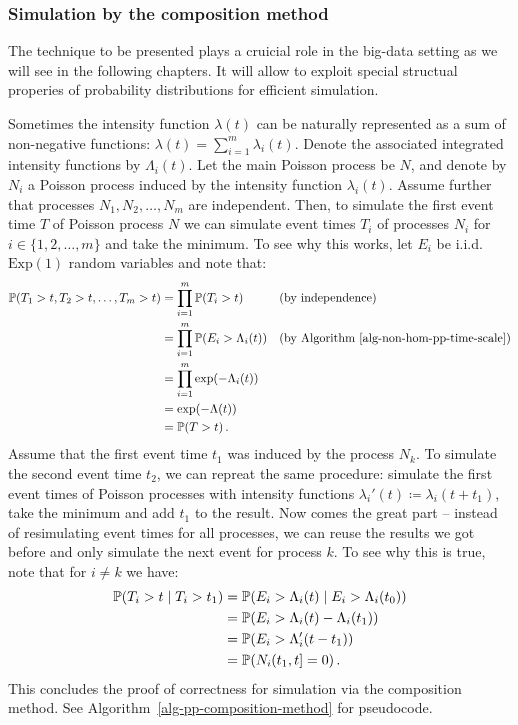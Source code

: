 \documentclass[report.tex]{subfiles}
\begin{document}
\subsubsection{Simulation by the composition method}

The technique to be presented plays a cruicial role in the big-data
setting as we will see in the following chapters.
It will allow to exploit special structual properies of probability distributions
for efficient simulation.

Sometimes the intensity function $\lambda(t)$ can be naturally represented
as a sum of non-negative functions: $\lambda(t) = \sum_{i=1}^{m} \lambda_{i}(t)$.
Denote the associated integrated intensity functions by $\Lambda_{i}(t)$.
Let the main Poisson process be $N$, and denote by $N_{i}$ a Poisson process induced
by the intensity function $\lambda_{i}(t)$. Assume further that processes
$N_{1}, N_{2}, \dots, N_{m}$ are independent.
Then, to simulate the first event time $T$ of Poisson process $N$ we can simulate event times
$T_{i}$ of processes $N_{i}$ for $i \in \{1, 2, \dots, m\}$ and take
the minimum.
To see why this works, let $E_{i}$ be i.i.d. $\text{Exp}(1)$ random variables and
note that:
\begin{align*}
  \mathbb{P}\!\left({T_{1} > t, T_{2} > t, \dots, T_{m} > t}\right)
  &= \prod_{i=1}^{m} \mathbb{P}\!\left({T_{i} > t}\right) && \text{(by independence)} \\
  &= \prod_{i=1}^{m} \mathbb{P}\!\left({E_{i} > \Lambda_{i}(t)}\right) && \text{(by Algorithm~\ref{alg-non-hom-pp-time-scale})} \\
  &= \prod_{i=1}^{m} \exp(-\Lambda_{i}(t)) \\
  &= \exp(-\Lambda(t)) \\
  &= \mathbb{P}\!\left({T > t}\right).
\end{align*}
Assume that the first event time $t_{1}$ was induced
by the process $N_{k}$.
To simulate the second event time $t_{2}$, we can repreat the same procedure:
simulate the first event times of Poisson processes with intensity
functions \mbox{$\lambda_{i}'(t) \coloneqq \lambda_{i}(t + t_{1})$},
take the minimum and add $t_{1}$ to the result.
Now comes the great part -- instead of resimulating event times for all
processes, we can reuse the results we got before and only simulate the next
event for process $k$.
To see why this is true, note that for $i \neq k$ we have:
\begin{align*}
\mathbb{P}\!\left({T_{i} > t} \mid {T_{i} > t_{1}}\right)
&= \mathbb{P}\!\left({E_{i} > \Lambda_{i}(t)} \mid {E_{i} > \Lambda_{i}(t_{0})}\right) \\
&= \mathbb{P}\!\left({E_{i} > \Lambda_{i}(t) - \Lambda_{i}(t_{1})}\right) \\
&= \mathbb{P}\!\left({E_{i} > \Lambda_{i}'(t - t_{1})}\right) \\
&= \mathbb{P}\!\left({{N_{i\,}}\!({t_{1}},{t}] = 0}\right).
\end{align*}
This concludes the proof of correctness for simulation via the composition method.
See Algorithm~\ref{alg-pp-composition-method} for pseudocode.
\end{document}
